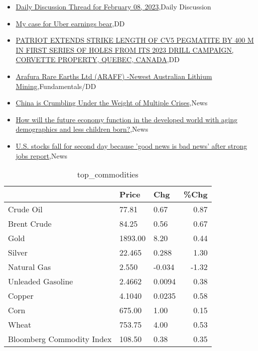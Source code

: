\documentclass{article}%
\begin{document}
%
\begin{itemize}%
\item%
\href{https://reddit.com/r/wallstreetbets/comments/10wtszg/daily\_discussion\_thread\_for\_february\_08\_2023/}{Daily Discussion Thread for February 08, 2023},Daily Discussion%
\item%
\href{https://reddit.com/r/wallstreetbets/comments/10wpk4m/my\_case\_for\_uber\_earnings\_bear/}{My case for Uber earnings bear},DD%
\item%
\href{https://reddit.com/r/Baystreetbets/comments/10v6dvz/patriot\_extends\_strike\_length\_of\_cv5\_pegmatite\_by/}{PATRIOT EXTENDS STRIKE LENGTH OF CV5 PEGMATITE BY 400 M IN FIRST SERIES OF HOLES FROM ITS 2023 DRILL CAMPAIGN, CORVETTE PROPERTY, QUEBEC, CANADA},DD%
\item%
\href{https://reddit.com/r/StockMarket/comments/10wvrb3/arafura\_rare\_earths\_ltd\_araff\_newest\_australian/}{Arafura Rare Earths Ltd (ARAFF) -Newest Australian Lithium Mining},Fundamentals/DD%
\item%
\href{https://reddit.com/r/Economics/comments/10wmufd/china\_is\_crumbling\_under\_the\_weight\_of\_multiple/}{China is Crumbling Under the Weight of Multiple Crises},News%
\item%
\href{https://reddit.com/r/Economics/comments/10wkoig/how\_will\_the\_future\_economy\_function\_in\_the/}{How will the future economy function in the developed world with aging demographics and less children born?},News%
\item%
\href{https://reddit.com/r/Economics/comments/10wi6lr/us\_stocks\_fall\_for\_second\_day\_because\_good\_news/}{U.S. stocks fall for second day because 'good news is bad news' after strong jobs report},News%
\end{itemize}%


\begin{table}[htbp]%
\caption{top\_commodities}%
\centering%
\begin{adjustbox}{width=1\textwidth}%
\begin{tabular}{lllr}
\toprule
                          &   Price &    Chg &  \%Chg \\
\midrule
               Crude Oil  &   77.81 &   0.67 &  0.87 \\
             Brent Crude  &   84.25 &   0.56 &  0.67 \\
                    Gold  & 1893.00 &   8.20 &  0.44 \\
                  Silver  &  22.465 &  0.288 &  1.30 \\
             Natural Gas  &   2.550 & -0.034 & -1.32 \\
       Unleaded Gasoline  &  2.4662 & 0.0094 &  0.38 \\
                  Copper  &  4.1040 & 0.0235 &  0.58 \\
                    Corn  &  675.00 &   1.00 &  0.15 \\
                   Wheat  &  753.75 &   4.00 &  0.53 \\
Bloomberg Commodity Index &  108.50 &   0.38 &  0.35 \\
\bottomrule
\end{tabular}
%
\end{adjustbox}%
\end{table}
\end{document}
